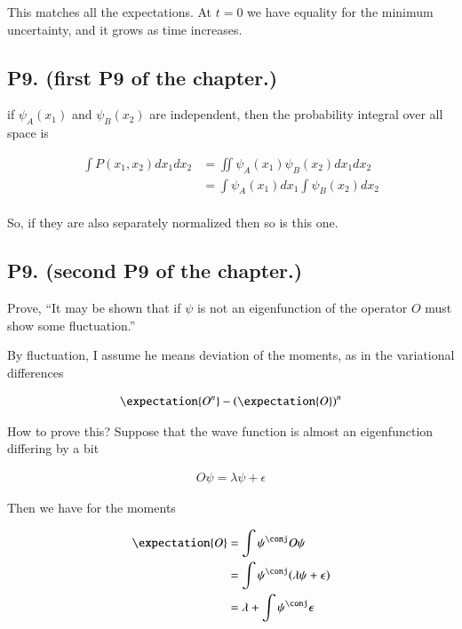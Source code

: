 \documentclass{article}
\begin{document}
This matches all the expectations.  At $t=0$ we have equality for the minimum uncertainty, and it grows as
time increases.

\subsection{P9. (first P9 of the chapter.) }

if $\psi_A(x_1)$ and $\psi_B(x_2)$ are independent, then the probability integral over all space is

\begin{align*}
\int P(x_1, x_2) dx_1 dx_2
&=
\iint \psi_A(x_1) \psi_B(x_2) dx_1 dx_2 \\
&=
\int \psi_A(x_1) dx_1 \int \psi_B(x_2) dx_2 \\
\end{align*}

So, if they are also separately normalized then so is this one.

\subsection{P9. (second P9 of the chapter.) }

Prove, ``It may be shown that if $\psi$ is not an eigenfunction of the operator $O$ must show some fluctuation.''

By fluctuation, I assume he means deviation of the moments, 
as in the variational differences

\begin{align*}
\expectation{O^n} - (\expectation{O})^n 
\end{align*}

How to prove this?  Suppose that the wave function is almost an eigenfunction
differing by a bit

\begin{align*}
O \psi = \lambda \psi + \epsilon
\end{align*}

Then we have for the moments

\begin{align*}
\expectation{O}
&= \int \psi^\conj O \psi \\
&= \int \psi^\conj ( \lambda \psi + \epsilon ) \\
&= \lambda + \int \psi^\conj \epsilon \\
\end{align*}
\end{document}
